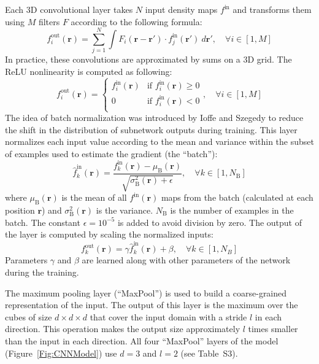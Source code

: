 \documentclass{bioinfo}
\begin{document}
Each 3D convolutional layer takes $N$ input density maps $f^\text{in}$
and transforms them using $M$ filters $F$ according to the following
formula:
\begin{equation}
f^\text{out}_i (\mathbf{r}) = \sum^{N}_{j=1} \int F_i (\mathbf{r} - \mathbf{r'}) \cdot f^\text{in}_j(\mathbf{r'}) ~d\mathbf{r'}, \quad\forall i \in [1,M]
\end{equation}
In practice, these convolutions are approximated by sums on a 3D grid.
The ReLU nonlinearity is computed as following:
\begin{equation}
f^\text{out}_i (\mathbf{r}) = \begin{cases}
               f^\text{in}_i(\mathbf{r}) &\text{if } f^\text{in}_i(\mathbf{r})\geq 0\\
               0                         &\text{if } f^\text{in}_i(\mathbf{r})<0\\
            \end{cases}, \quad\forall i \in [1,M]
\end{equation}
The idea of batch normalization was introduced by Ioffe and Szegedy
\citep{ioffe2015batch} to reduce the shift in the distribution of
subnetwork outputs during training. This layer normalizes each input
value according to the mean and variance within the subset of examples
used to estimate the gradient (the ``batch''):
\begin{equation}
\hat{f}^\text{in}_k(\mathbf{r}) = \frac{f^\text{in}_k(\mathbf{r}) - \mu_\text{B}(\mathbf{r})}{\sqrt{\sigma^{2}_\text{B}(\mathbf{r}) + \epsilon}}, \quad\forall k \in [1,N_\text{B}]
\end{equation}
where $\mu_\text{B}(\mathbf{r})$ is the mean of all
$f^\text{in}(\mathbf{r})$ maps from the batch (calculated at each
position $\mathbf{r}$) and $\sigma^{2}_\text{B}(\mathbf{r})$ is the
variance. $N_\text{B}$ is the number of examples in the batch. The constant
$\epsilon = 10^{-5}$ is added to avoid division by zero.
The output of the layer is computed by scaling the normalized inputs:
\begin{equation}
f^\text{out}_k(\mathbf{r}) = \gamma \hat{f}^\text{in}_k(\mathbf{r}) + \beta, \quad\forall k \in [1,N_B]
\end{equation}
Parameters $\gamma$ and $\beta$ are learned along with other
parameters of the network during the training.

The maximum pooling layer (``MaxPool'') is used to build a
coarse-grained representation of the input. The output of this layer
is the maximum over the cubes of size $d \times d \times d$ that cover
the input domain with a stride $l$ in each direction.  This operation
makes the output size approximately $l$ times smaller than the
input in each direction.  All four ``MaxPool'' layers of the model
(Figure~\ref{Fig:CNNModel}) use $d=3$ and $l=2$ (see Table~S3).
\end{document}
